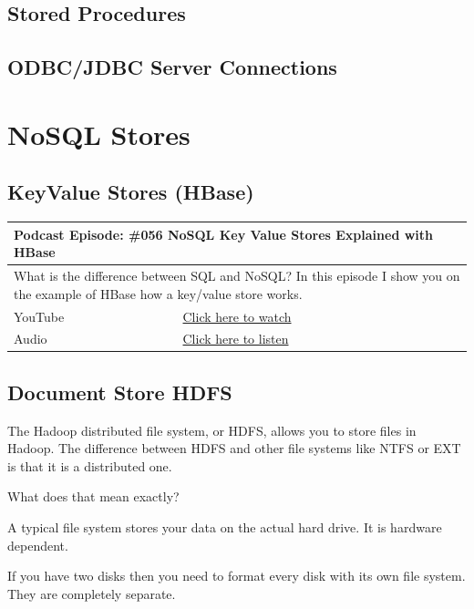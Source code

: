 \documentclass[12pt, numbers=noenddot]{scrreprt} %
\begin{document}
\subsection{Stored Procedures}
\subsection{ODBC/JDBC Server Connections}

\section{NoSQL Stores}
\subsection{KeyValue Stores (HBase)}

\begin{table}[h]
\begin{tabular}{ll}
\hline
\multicolumn{2}{l}{\textbf{Podcast Episode:} \#056 NoSQL Key Value Stores Explained with HBase} \\ \hline
\multicolumn{2}{p{15cm}}{What is the difference between SQL and NoSQL? In this episode I show you on the example of HBase how a key/value store works. }         \\ \hline
\multicolumn{1}{l|}{YouTube}   & \href{https://youtu.be/67hIkbpzFc8}{Click here to watch}   \\
\multicolumn{1}{l|}{Audio}     & \href{https://anchor.fm/andreaskayy/episodes/056-NoSQL-Key-Value-Stores-Explained-With-HBase-e45ifb}{Click here to listen}   \\ \hline
\end{tabular}
\end{table}

\subsection{Document Store HDFS}

The Hadoop distributed file system, or HDFS, allows you to store files in Hadoop. The difference between HDFS and other file systems like NTFS or EXT is that it is a distributed one.

What does that mean exactly?

A typical file system stores your data on the actual hard drive. It is hardware dependent.

If you have two disks then you need to format every disk with its own file system. They are completely separate.
\end{document}
